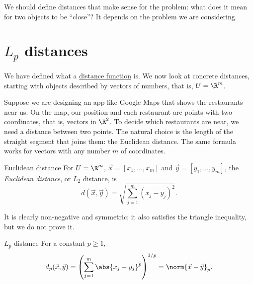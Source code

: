 \documentclass[a4paper,12pt,oneside]{report}
\begin{document}
\begin{center}
\end{center}

We should define distances that make sense for the problem: what does
it mean for two objects to be ``close''? It depends on the problem we
are considering.

\section{\texorpdfstring{$L_p$}{Lp} distances}

We have defined what a \hyperref[def:distance]{distance function} is.
We now look at concrete distances,
starting with objects described by vectors of numbers, that is,
$U=\R^m$.

Suppose we are designing an app like Google Maps that shows the
restaurants near us. On the map, our position and each restaurant are
points with two coordinates, that is, vectors in $\R^2$. To decide
which restaurants are near, we need a distance between two points. The
natural choice is the length of the straight segment that joins them:
the Euclidean distance. The same formula works for vectors with any
number $m$ of coordinates.

\begin{frameddefn}{Euclidean distance}\label{def:euclidean}
For $U=\R^m$, $\vec x=[x_1,\ldots,x_m]$ and $\vec y=[y_1,\ldots,y_m]$,
the \emph{Euclidean distance}, or $L_2$ distance, is
\[
  d(\vec x,\vec y)=\sqrt{\sum_{j=1}^{m}(x_j-y_j)^2}.
\]
\end{frameddefn}

It is clearly non-negative and symmetric; it also satisfies the
triangle inequality, but we do not prove it.

\begin{frameddefn}{$L_p$ distance}\label{def:lp-distance}
For a constant $p\geq1$,
\[
  d_p(\vec x,\vec y)
  =\left(\sum_{j=1}^{m}\abs{x_j-y_j}^p\right)^{1/p}
  =\norm{\vec x-\vec y}_p.
\]
\end{frameddefn}
\end{document}
